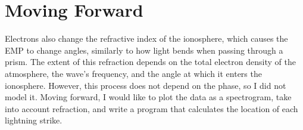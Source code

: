\documentclass[12pt, reqno]{amsart}
\begin{document}
\section{Moving Forward}
\noindent Electrons also change the refractive index of the ionosphere, which causes the EMP to change angles, similarly to how light bends when passing through a prism. The extent of this refraction depends on the total electron density of the atmosphere, the wave's frequency, and the angle at which it enters the ionosphere. However, this process does not depend on the phase, so I did not model it.  Moving forward, I would like to plot the data as a spectrogram, take into account refraction, and write a program that calculates the location of each lightning strike.
\\
\\
\cite{ionosphericdelay} 
\cite{forte}
\cite{edfenimore}
\medskip
\printbibliography
\end{document}
